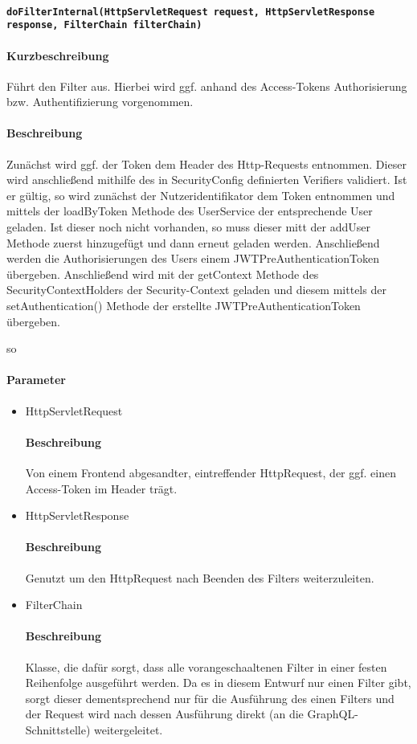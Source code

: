 \paragraph{\texttt{doFilterInternal(HttpServletRequest request, HttpServletResponse response, FilterChain filterChain)}}%
\paragraph*{Kurzbeschreibung}
Führt den Filter aus. Hierbei wird ggf. anhand des Access-Tokens Authorisierung bzw. Authentifizierung vorgenommen.
\paragraph*{Beschreibung}
Zunächst wird ggf. der Token dem Header des Http-Requests entnommen. Dieser wird anschließend mithilfe des in
\dq SecurityConfig \dq definierten Verifiers validiert. Ist er gültig, so wird zunächst der Nutzeridentifikator dem Token entnommen und mittels der \dq loadByToken \dq Methode 
des UserService der entsprechende User geladen. Ist dieser noch nicht vorhanden, so muss dieser mitt der \dq addUser \dq Methode
zuerst hinzugefügt und dann erneut geladen werden. Anschließend werden die Authorisierungen des Users einem \dq 
JWTPreAuthenticationToken \dq übergeben. Anschließend wird mit der \dq getContext \dq Methode des SecurityContextHolders der 
Security-Context geladen und diesem mittels der \dq setAuthentication() \dq Methode der erstellte JWTPreAuthenticationToken 
übergeben. 

so
\paragraph*{Parameter}
\begin{itemize}
    \item HttpServletRequest
    		\paragraph*{Beschreibung}
            Von einem Frontend abgesandter, eintreffender HttpRequest, der ggf. einen Access-Token im Header trägt.
    \item HttpServletResponse
        	\paragraph*{Beschreibung}
            Genutzt um den HttpRequest nach Beenden des Filters weiterzuleiten.
    \item FilterChain
    		\paragraph*{Beschreibung}
            Klasse, die dafür sorgt, dass alle vorangeschaaltenen Filter in einer festen Reihenfolge ausgeführt werden. Da es in diesem Entwurf nur einen Filter gibt,
            sorgt dieser dementsprechend nur für die Ausführung des einen Filters und der Request wird nach dessen Ausführung direkt (an die GraphQL-Schnittstelle) weitergeleitet.

\end{itemize}